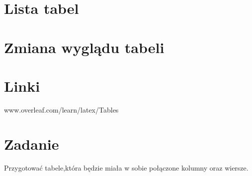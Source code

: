 \documentclass{beamer}
\begin{document}
\section{Lista tabel}
\begin{frame}
 
\end{frame}

\section{Zmiana wyglądu tabeli}
\begin{frame}
 
\end{frame}

\section{Linki}
\begin{frame}
 www.overleaf.com/learn/latex/Tables
\end{frame}

\section{Zadanie}
\begin{frame}
 Przygotować tabele,która będzie miała w sobie połączone kolumny oraz wiersze.
 
\end{frame}
 
 
\end{document}
